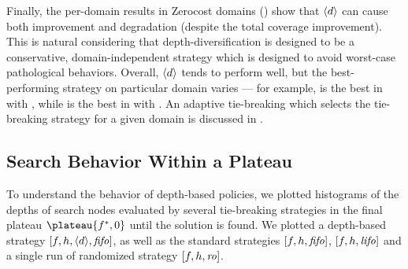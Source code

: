 Finally, the per-domain results in Zerocost domains () show that 
${\left<d\right>}$ can cause both improvement and degradation (despite the total coverage improvement).
This is natural considering that depth-diversification is designed to be a conservative, domain-independent strategy which is designed to avoid worst-case pathological behaviors.
 Overall,  ${\left<d\right>}$ tends to perform well, but the best-performing strategy on particular domain varies
   --- for example,
 \fifo is the best in  with \lmcut, while
 \lifo is the best in  with \lmcut.
 An adaptive tie-breaking which selects the tie-breaking strategy for a given domain is discussed in .




\subsection{Search Behavior Within a Plateau}

To understand the behavior of depth-based policies, we plotted 
histograms of the depths of search nodes evaluated by several tie-breaking
strategies in the final plateau $\plateau{f^*,0}$ until the solution is
found.  We plotted a depth-based strategy
$[f,h,{\left<d\right>},{\text{\textit{fifo}}}]$, as well as the standard strategies $[f,h,{\text{\textit{fifo}}}]$,
$[f,h,{\text{\textit{lifo}}}]$ and a single run of randomized strategy $[f,h,{\text{\textit{ro}}}]$.

